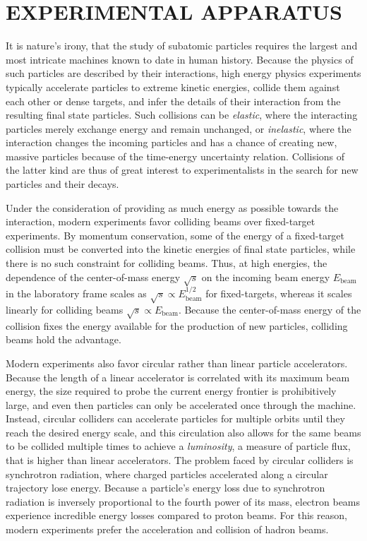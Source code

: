 \chapter{EXPERIMENTAL APPARATUS} \label{experiment}

It is nature's irony, that the study of subatomic particles requires the largest and most intricate machines known to date in human history. Because the physics of such particles are described by their interactions, high energy physics experiments typically accelerate particles to extreme kinetic energies, collide them against each other or dense targets, and infer the details of their interaction from the resulting final state particles. Such collisions can be \textit{elastic}, where the interacting particles merely exchange energy and remain unchanged, or \textit{inelastic}, where the interaction changes the incoming particles and has a chance of creating new, massive particles because of the time-energy uncertainty relation. Collisions of the latter kind are thus of great interest to experimentalists in the search for new particles and their decays.

Under the consideration of providing as much energy as possible towards the interaction, modern experiments favor colliding beams over fixed-target experiments. By momentum conservation, some of the energy of a fixed-target collision must be converted into the kinetic energies of final state particles, while there is no such constraint for colliding beams. Thus, at high energies, the dependence of the center-of-mass energy $\sqrt{s}$ on the incoming beam energy $E_{\textrm{beam}}$ in the laboratory frame scales as $\sqrt{s} \propto E_{\textrm{beam}}^{1/2}$ for fixed-targets, whereas it scales linearly for colliding beams $\sqrt{s} \propto E_{\textrm{beam}}$. Because the center-of-mass energy of the collision fixes the energy available for the production of new particles, colliding beams hold the advantage.

Modern experiments also favor circular rather than linear particle accelerators. Because the length of a linear accelerator is correlated with its maximum beam energy, the size required to probe the current energy frontier is prohibitively large, and even then particles can only be accelerated once through the machine. Instead, circular colliders can accelerate particles for multiple orbits until they reach the desired energy scale, and this circulation also allows for the same beams to be collided multiple times to achieve a \textit{luminosity}, a measure of particle flux, that is higher than linear accelerators. The problem faced by circular colliders is synchrotron radiation, where charged particles accelerated along a circular trajectory lose energy. Because a particle's energy loss due to synchrotron radiation is inversely proportional to the fourth power of its mass, electron beams experience incredible energy losses compared to proton beams. For this reason, modern experiments prefer the acceleration and collision of hadron beams.

